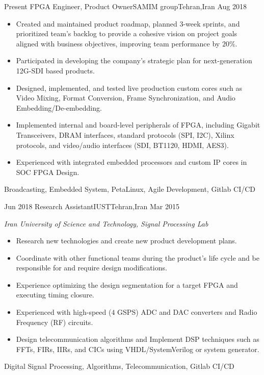 
\begin{experiences}
	\experience
	{Present} {FPGA Engineer, Product Owner}{SAMIM group}{Tehran,Iran}
	{Aug 2018} {
		\begin{itemize}
			\item Created and maintained product roadmap, planned 3-week sprints,
			      and prioritized team's backlog to provide a cohesive vision on
			      project goals aligned with business objectives, improving team
			      performance by $20\%$.
			\item Participated in developing the company's strategic plan for
			      next-generation 12G-SDI based products.
			\item Designed, implemented, and tested live production custom cores
			      such as Video Mixing, Format Conversion, Frame Synchronization,
			      and Audio Embedding/De-embedding.
			\item Implemented internal and board-level peripherals of FPGA, including
			      Gigabit Transceivers, DRAM interfaces,
			      standard protocols (SPI, I2C), Xilinx protocols, and video/audio
			      interfaces (SDI, BT1120, HDMI, AES3).
			\item Experienced with integrated embedded processors and custom IP cores
			      in SOC FPGA Design.
		\end{itemize}
	}
	{Broadcasting, Embedded System, PetaLinux, Agile Development, Gitlab CI/CD}
	
	\emptySeparator
	
	\experience
	{Jun 2018} {Research Assistant}{IUST}{Tehran,Iran}
	{Mar 2015} {
		\emph{Iran University of Science and Technology, Signal Processing Lab}
		\begin{itemize}
			\item Research new technologies and create new product development plans.
			\item Coordinate with other functional teams during the product's life
			      cycle and be responsible for and require design modifications.
			\item Experience optimizing the design segmentation for a target FPGA
			      and executing timing closure.
			\item Experienced with high-speed ($4$ GSPS) ADC and DAC converters
			      and Radio Frequency (RF) circuits.
			\item Design telecommunication algorithms and Implement DSP techniques
			      such as FFTs, FIRs, IIRs, and CICs using VHDL/SystemVerilog
			      or system generator.
		\end{itemize}
	}
	{Digital Signal Processing, Algorithms, Telecommunication, Gitlab CI/CD}
	

\end{experiences}
